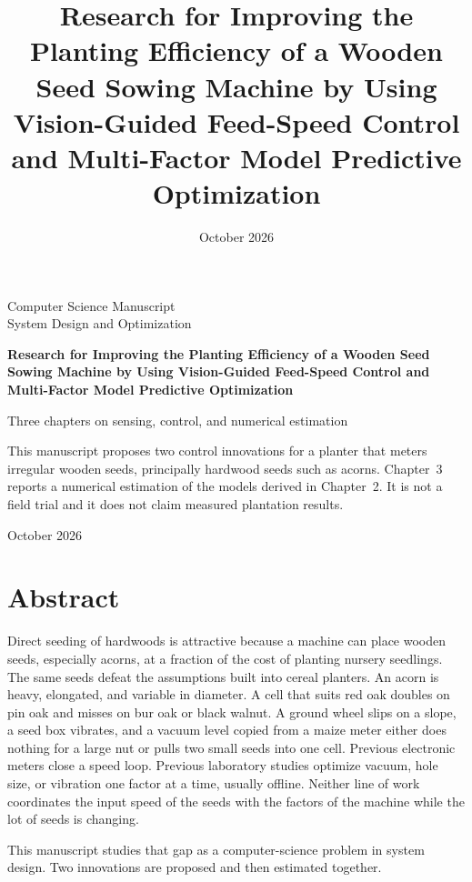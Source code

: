 \documentclass[12pt,a4paper]{report}
\title{Research for Improving the Planting Efficiency of a Wooden Seed Sowing Machine by Using Vision-Guided Feed-Speed Control and Multi-Factor Model Predictive Optimization}
\author{}
\date{October 2026}
\numberwithin{equation}{chapter}
\numberwithin{figure}{chapter}
\numberwithin{table}{chapter}
\begin{document}
\begin{titlepage}
\centering
\vspace*{1.6cm}
{\Large Computer Science Manuscript}\\[0.4cm]
{\large System Design and Optimization}\\[2.2cm]
{\LARGE\bfseries Research for Improving the Planting Efficiency of a Wooden Seed Sowing Machine by Using Vision-Guided Feed-Speed Control and Multi-Factor Model Predictive Optimization\par}
\vspace{1.6cm}
{\large Three chapters on sensing, control, and numerical estimation}\\[2.4cm]
\begin{minipage}{0.86\textwidth}
\small
This manuscript proposes two control innovations for a planter that meters irregular wooden seeds, principally hardwood seeds such as acorns. Chapter~3 reports a numerical estimation of the models derived in Chapter~2. It is not a field trial and it does not claim measured plantation results.
\end{minipage}
\vfill
{\large October 2026}
\vspace{1.2cm}
\end{titlepage}

\setcounter{page}{1}

\chapter*{Abstract}

Direct seeding of hardwoods is attractive because a machine can place wooden seeds, especially acorns, at a fraction of the cost of planting nursery seedlings. The same seeds defeat the assumptions built into cereal planters. An acorn is heavy, elongated, and variable in diameter. A cell that suits red oak doubles on pin oak and misses on bur oak or black walnut. A ground wheel slips on a slope, a seed box vibrates, and a vacuum level copied from a maize meter either does nothing for a large nut or pulls two small seeds into one cell. Previous electronic meters close a speed loop. Previous laboratory studies optimize vacuum, hole size, or vibration one factor at a time, usually offline. Neither line of work coordinates the input speed of the seeds with the factors of the machine while the lot of seeds is changing.

This manuscript studies that gap as a computer-science problem in system design. Two innovations are proposed and then estimated together.
\end{document}
